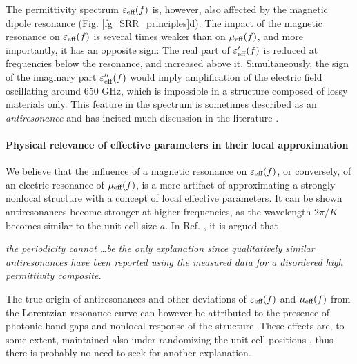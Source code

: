 The permittivity spectrum $\varepsilon_{\text{eff} }(f)$ is, however, also affected by the magnetic dipole resonance  (Fig. \ref{fg_SRR_principles}d). The impact of the magnetic resonance on $\varepsilon_{\text{eff} }(f)$ is several times weaker than on $\mu_{\text{eff} }(f)$, and more importantly, it has an opposite sign: The real part of $\varepsilon_{\text{eff} }'(f)$ is reduced at frequencies below the resonance, and increased above it. Simultaneously, the sign of the imaginary part $\varepsilon_{\text{eff} }''(f)$ would imply amplification of the electric field oscillating around 650 GHz, which is impossible in a structure composed of lossy materials only. This feature in the spectrum is sometimes described as an \textit{antiresonance} and has incited much discussion in the literature \cite{koschny2003resonant, wallen2011anti}. 
\paragraph{Physical relevance of effective parameters in their local approximation}%
We believe that the influence of a magnetic resonance on $\varepsilon_{\text{eff} }(f)$, or conversely, of an electric resonance of $\mu_{\text{eff} }(f)$, is a mere artifact of approximating a strongly nonlocal structure with a concept of local effective parameters. It can be shown antiresonances become stronger at higher frequencies, as the wavelength $2\pi/K$ becomes similar to the unit cell size $a$. 
In Ref. \cite{wallen2011anti}, it is argued that %
\begin{displayquote}
\textit{the periodicity cannot \ldots be the only explanation since qualitatively similar antiresonances have been reported using the measured data for a disordered high permittivity composite.}
\end{displayquote}
The true origin of antiresonances and other deviations of $\varepsilon_{\text{eff} }(f)$ and $\mu_{\text{eff} }(f)$ from the Lorentzian resonance curve can however be attributed to the presence of photonic band gaps and nonlocal response of the structure. These effects are, to some extent, maintained also under randomizing the unit cell positions \cite{peng2007},   
thus there is probably no need to seek for another explanation. %



